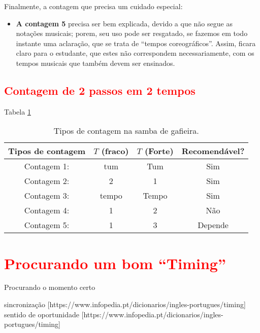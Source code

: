 Finalmente, a contagem que precisa um cuidado especial:
\begin{itemize}

\item \textbf{A contagem 5} precisa ser bem explicada, 
devido a que não segue as notações musicais; porem, seu uso pode ser resgatado,
se fazemos em todo instante uma aclaração, que se trata de ``tempos coreográficos''.
Assim, ficara claro para o estudante, que estes não correspondem necessariamente, 
com os tempos musicais que também devem ser ensinados.

\end{itemize}

\subsection{\textcolor{red}{Contagem de 2 passos em 2 tempos}}


Tabela \ref{tab:ritmoconta2}

\begin{table}[ht]
  \centering
  \begin{tabular}    {c|cc|c}
    \hline
    Tipos de contagem       & $T$ (fraco)  & $T$ (Forte)& Recomendável?\\
    \hline
    Contagem 1: & tum   & Tum   & Sim\\
    Contagem 2: & 2     & 1     & Sim\\
    Contagem 3: & tempo & Tempo & Sim\\ \hline
    Contagem 4: & 1     & 2     & Não\\ \hline
    Contagem 5: & 1     & 3     & Depende\\  \hline
    \hline
  \end{tabular}
  \caption{Tipos de contagem na samba de gafieira.}
\label{tab:ritmoconta2}
\end{table}

\section{\textcolor{red}{Procurando um bom ``Timing''}}
Procurando o momento certo

 sincronização [https://www.infopedia.pt/dicionarios/ingles-portugues/timing]
 sentido de oportunidade [https://www.infopedia.pt/dicionarios/ingles-portugues/timing]
